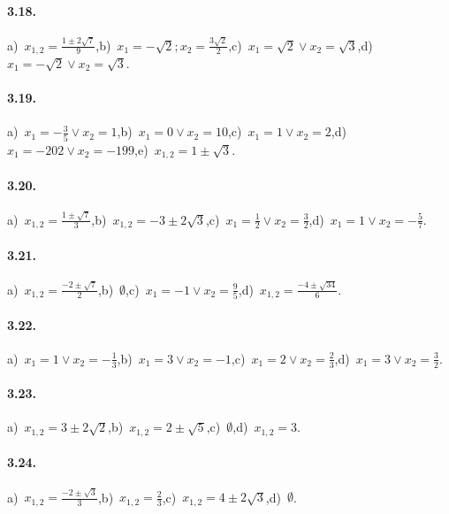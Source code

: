 \paragraph{3.18.} a)~$x_{1,2} = \frac{1 \pm 2 \sqrt{7}}{9}$,\quad b)~$x_{1} =-\sqrt{2};x_{2} = \frac{3 \sqrt{2}}{2}$,\quad c)~$x_{1} = \sqrt{2} \vee x_{2} = \sqrt{3}$,\quad d)~$x_{1} =-\sqrt{2} \vee x_{2} = \sqrt{3}$.

\paragraph{3.19.} a)~$x_{1} =-\frac{3}{5} \vee x_{2} = 1$,\quad b)~$x_{1} = 0 \vee x_{2} = 10$,\quad c)~$x_{1} = 1 \vee x_{2} = 2$,\quad d)~$x_{1} =-202 \vee x_{2} =-199$,\quad e)~$x_{1,2} = 1 \pm \sqrt{3}$.

\paragraph{3.20.} a)~$x_{1,2} = \frac{1 \pm \sqrt{7}}{3}$,\quad b)~$x_{1,2} =-3 \pm 2 \sqrt{3}$,\quad c)~$x_{1} = \frac{1}{2} \vee x_{2} = \frac{3}{2}$,\quad d)~$x_{1} = 1 \vee x_{2} =-\frac{5}{7}$.

\paragraph{3.21.} a)~$x_{1,2} = \frac{- 2 \pm \sqrt{7}}{2}$,\quad b)~$\emptyset$,\quad c)~$x_{1} =-1 \vee x_{2} = \frac{9}{5}$,\quad d)~$x_{1,2} = \frac{- 4 \pm \sqrt{34}}{6}$.

\paragraph{3.22.} a)~$x_{1} = 1 \vee x_{2} =-\frac{1}{3}$,\quad b)~$x_{1} = 3 \vee x_{2} =-1$,\quad c)~$x_{1} = 2 \vee x_{2} = \frac{2}{3}$,\quad d)~$x_{1} = 3 \vee x_{2} = \frac{3}{2}$.

\paragraph{3.23.} a)~$x_{1,2} = 3 \pm 2 \sqrt{2}$,\quad b)~$x_{1,2} = 2 \pm \sqrt{5}$,\quad c)~$\emptyset$,\quad d)~$x_{1,2} =3$.

\paragraph{3.24.} a)~$x_{1,2} = \frac{- 2 \pm \sqrt{3}}{3}$,\quad b)~$x_{1,2} = \frac{2}{3}$,\quad c)~$x_{1,2} = 4 \pm 2 \sqrt{3}$,\quad d)~$\emptyset$.

